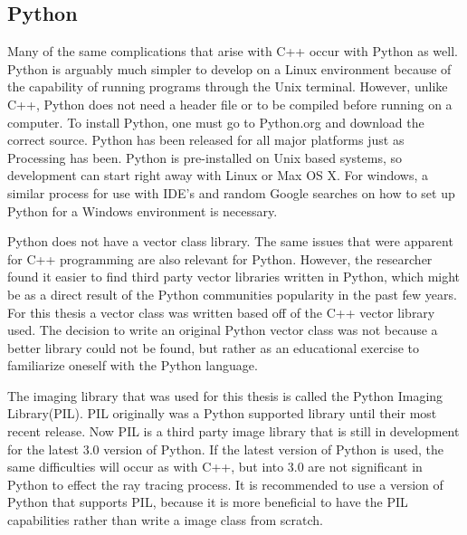 \subsection{Python}
Many of the same complications that arise with C++ occur with Python as well.  Python is arguably much simpler to develop on a Linux environment because of the capability of running programs through the Unix terminal.  However, unlike C++, Python does not need a header file or to be compiled before running on a computer.  To install Python, one must go to Python.org and download the correct source.  Python has been released for all major platforms just as Processing has been.  Python is pre-installed on Unix based systems, so development can start right away with Linux or Max OS X.  For windows, a similar process for use with IDE's and random Google searches on how to set up Python for a Windows environment is necessary.

Python does not have a vector class library.  The same issues that were apparent for C++ programming are also relevant for Python.  However, the researcher found it easier to find third party vector libraries written in Python, which might be as a direct result of the Python communities popularity in the past few years.  For this thesis a vector class was written based off of the C++ vector library used.  The decision to write an original Python vector class was not because a better library could not be found, but rather as an educational exercise to familiarize oneself with the Python language.

The imaging library that was used for this thesis is called the Python Imaging Library(PIL).  PIL originally was a Python supported library until their most recent release.  Now PIL is a third party image library that is still in development for the latest 3.0 version of Python.  If the latest version of Python is used, the same difficulties will occur as with C++, but into 3.0 are not significant in Python to effect the ray tracing process. It is recommended to use a version of Python that supports PIL, because it is more beneficial to have the PIL capabilities rather than write a image class from scratch.
